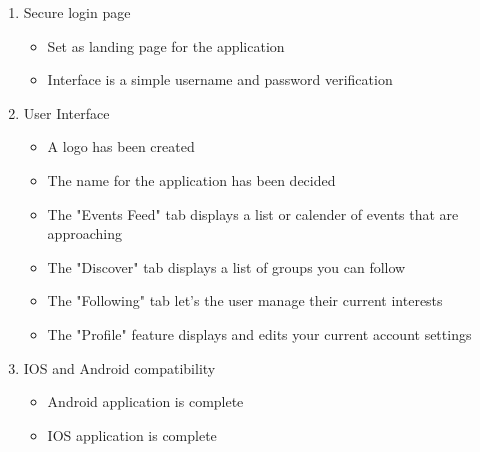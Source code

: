 \documentclass[10pt,letterpaper]{article}
\begin{document}
\begin{enumerate}
   \item Secure login page
     \begin{itemize}
     	\item Set as landing page for the application
        \item Interface is a simple username and password verification
     \end{itemize}
   \item User Interface
     \begin{itemize}
        \item A logo has been created
        \item The name for the application has been decided
        \item The "Events Feed" tab displays a list or calender of events that are approaching
        \item The "Discover" tab displays a list of groups you can follow
        \item The "Following" tab let's the user manage their current interests
        \item The "Profile" feature displays and edits your current account settings
	\end{itemize}
   \item IOS and Android compatibility 
   	\begin{itemize}
    	\item Android application is complete
    	\item IOS application is complete
    \end{itemize}

\end{enumerate}
\end{document}
